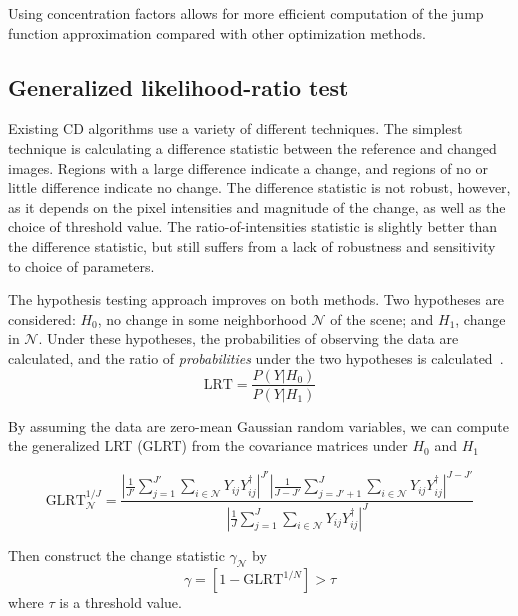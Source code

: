 \documentclass{article}
\begin{document}
Using concentration factors allows for more efficient computation of the jump function approximation compared with other optimization methods.

\subsection{Generalized likelihood-ratio test}

Existing CD algorithms use a variety of different techniques. The simplest technique is calculating a difference statistic between the reference and changed images. Regions with a large difference indicate a change, and regions of no or little difference indicate no change. The difference statistic is not robust, however, as it depends on the pixel intensities and magnitude of the change, as well as the choice of threshold value. The ratio-of-intensities statistic is slightly better than the difference statistic, but still suffers from a lack of robustness and sensitivity to choice of parameters.

The hypothesis testing approach improves on both methods. Two hypotheses are considered: $H_0$, no change in some neighborhood $\mathcal{N}$ of the scene; and $H_1$, change in $\mathcal{N}$. Under these hypotheses, the probabilities of observing the data are calculated, and the ratio of \emph{probabilities} under the two hypotheses is calculated~\cite{novak_2005}.
\begin{equation}
    \text{LRT} = \frac{P(Y | H_0)}{P(Y | H_1)}
\end{equation}

By assuming the data are zero-mean Gaussian random variables, we can compute the generalized LRT (GLRT) from the covariance matrices under $H_0$ and $H_1$

\begin{equation}\label{eq:glrt}
    \text{GLRT}^{1/J}_{\mathcal{N}} = \frac{
        \left|\frac{1}{J'} \sum_{j=1}^{J'} \sum_{i \in \mathcal{N}}
                    Y_{ij}Y_{ij}^\dagger \right|^{J'} %
        \left|\frac{1}{J-J'} \sum_{j=J'+1}^{J} \sum_{i \in \mathcal{N}}
                    Y_{ij}Y_{ij}^\dagger \right|^{J-J'}}%
        {\left|\frac{1}{J} \sum_{j=1}^J \sum_{i \in \mathcal{N}}
                    Y_{ij}Y_{ij}^\dagger \right|^J} %
\end{equation}

Then construct the change statistic $\gamma_\mathcal{N}$ by
\begin{equation}
    \gamma = \left[ 1-\text{GLRT}^{1/N} \right] > \tau
\end{equation}
where $\tau$ is a threshold value.
\end{document}
